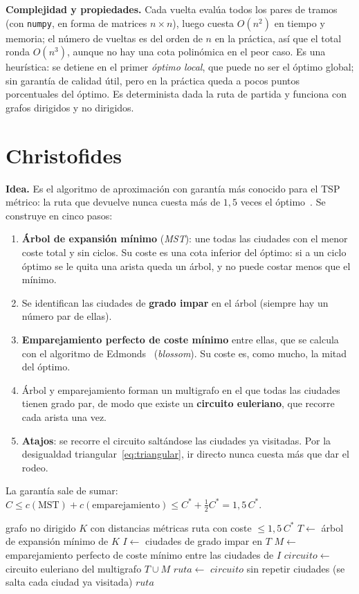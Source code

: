 \textbf{Complejidad y propiedades.} Cada vuelta evalúa todos los pares de tramos (con \texttt{numpy}, en forma de matrices $n\times n$), luego cuesta $O(n^2)$ en tiempo y memoria; el número de vueltas es del orden de $n$ en la práctica, así que el total ronda $O(n^3)$,
aunque no hay una cota polinómica en el peor caso. Es una heurística: se detiene en el primer \emph{óptimo local}, que puede no ser el óptimo global; sin garantía de calidad útil, pero en la práctica queda a pocos puntos porcentuales del óptimo.
Es determinista dada la ruta de partida y funciona con grafos dirigidos y no dirigidos.

\section{Christofides}\label{sec:christofides}

\textbf{Idea.} Es el algoritmo de aproximación con garantía más conocido para el TSP métrico: la ruta que devuelve nunca cuesta más de $1{,}5$ veces el óptimo~\cite{christofides1976}. Se construye en cinco pasos:
\begin{enumerate}[label=\arabic*.]
  \item \textbf{Árbol de expansión mínimo} (\emph{MST}): une todas las ciudades con el menor coste total y sin ciclos. Su coste es una cota inferior del óptimo: si a un ciclo óptimo se le quita una arista queda un árbol, y no puede costar menos que el mínimo.
  \item Se identifican las ciudades de \textbf{grado impar} en el árbol (siempre hay un número par de ellas).
  \item \textbf{Emparejamiento perfecto de coste mínimo} entre ellas, que se calcula con el algoritmo de Edmonds~\cite{edmonds1965} (\emph{blossom}). Su coste es, como mucho, la mitad del óptimo.
  \item Árbol y emparejamiento forman un multigrafo en el que todas las ciudades tienen grado par, de modo que existe un \textbf{circuito euleriano}, que recorre cada arista una vez.
  \item \textbf{Atajos}: se recorre el circuito saltándose las ciudades ya visitadas. Por la desigualdad triangular~\eqref{eq:triangular}, ir directo nunca cuesta más que dar el rodeo.
\end{enumerate}
La garantía sale de sumar: $C \le c(\text{MST}) + c(\text{emparejamiento}) \le C^{*} + \tfrac12 C^{*} = 1{,}5\,C^{*}$.

\begin{algorithm}[htbp]
  \caption{Christofides (grafo no dirigido)}\label{alg:chr}
  \begin{algorithmic}[1]
    \Require grafo no dirigido $K$ con distancias métricas
    \Ensure ruta con coste $\le 1{,}5\,C^{*}$
    \State $T \gets$ árbol de expansión mínimo de $K$
    \State $I \gets$ ciudades de grado impar en $T$
    \State $M \gets$ emparejamiento perfecto de coste mínimo entre las ciudades de $I$
    \State $circuito \gets$ circuito euleriano del multigrafo $T\cup M$
    \State $ruta \gets$ $circuito$ sin repetir ciudades (se salta cada ciudad ya visitada)
    \State \Return $ruta$
  \end{algorithmic}
\end{algorithm}

